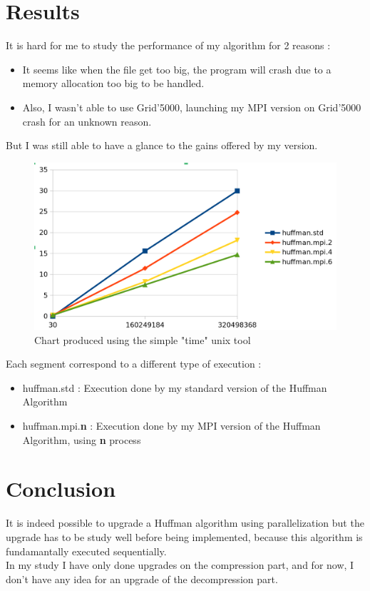 \section{Results}
It is hard for me to study the performance of my algorithm for 2 reasons :
\begin{itemize}
	\item It seems like when the file get too big, the program will crash due to a memory allocation too big to be handled.
	\item Also, I wasn't able to use Grid'5000, launching my MPI version on Grid'5000 crash for an unknown reason.
\end{itemize}
But I was still able to have a glance to the gains offered by my version.\\
\begin{figure}[H]
    \centering
    \includegraphics[scale=0.8]{img/chart.png}
    \caption{Chart produced using the simple "time" unix tool}
    \label{fig:my_label}
\end{figure}
Each segment correspond to a different type of execution :
\begin{itemize}
	\item huffman.std : Execution done by my standard version of the Huffman Algorithm
	\item huffman.mpi.\textbf{n} : Execution done by my MPI version of the Huffman Algorithm, using \textbf{n} process
\end{itemize}

\section{Conclusion}
It is indeed possible to upgrade a Huffman algorithm using parallelization but the upgrade has to be study well before being implemented, because this algorithm is fundamantally executed sequentially.\\
In my study I have only done upgrades on the compression part, and for now, I don't have any idea for an upgrade of the decompression part.